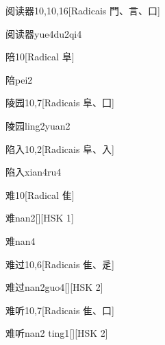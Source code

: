 \begin{entry}{阅读器}{10,10,16}[Radicais ⾨、⾔、⼝]
  \begin{phonetics}{阅读器}{yue4du2qi4}
  \end{phonetics}
\end{entry}

\begin{entry}{陪}{10}[Radical ⾩]
  \begin{phonetics}{陪}{pei2}
  \end{phonetics}
\end{entry}

\begin{entry}{陵园}{10,7}[Radicais ⾩、⼞]
  \begin{phonetics}{陵园}{ling2yuan2}
  \end{phonetics}
\end{entry}

\begin{entry}{陷入}{10,2}[Radicais ⾩、⼊]
  \begin{phonetics}{陷入}{xian4ru4}
  \end{phonetics}
\end{entry}

\begin{entry}{难}{10}[Radical ⾫]
  \begin{phonetics}{难}{nan2}[][HSK 1]
  \end{phonetics}
  \begin{phonetics}{难}{nan4}
  \end{phonetics}
\end{entry}

\begin{entry}{难过}{10,6}[Radicais ⾫、⾡]
  \begin{phonetics}{难过}{nan2guo4}[][HSK 2]
  \end{phonetics}
\end{entry}

\begin{entry}{难听}{10,7}[Radicais ⾫、⼝]
  \begin{phonetics}{难听}{nan2 ting1}[][HSK 2]
  \end{phonetics}
\end{entry}

